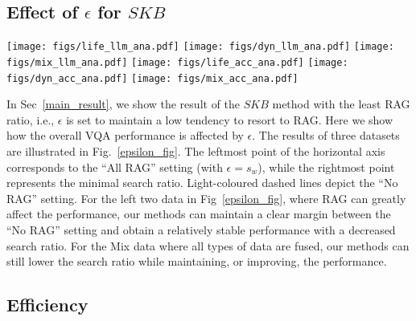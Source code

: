 \subsection{Effect of $\epsilon$ for $SKB$}
\label{epsilon_section}


\begin{figure*}[tb]
    \centering
    \texttt{[image: figs/life\_llm\_ana.pdf]}
    \texttt{[image: figs/dyn\_llm\_ana.pdf]}
    \texttt{[image: figs/mix\_llm\_ana.pdf]}
    \texttt{[image: figs/life\_acc\_ana.pdf]}
    \texttt{[image: figs/dyn\_acc\_ana.pdf]}
    \texttt{[image: figs/mix\_acc\_ana.pdf]}
    \caption{Effect of $\epsilon$. The lighter dashed lines accordingly indicate the performance under each base model's ``No RAG'' setting. Knowledge Boundary model is Qwen-VL-7B-Chat.}
    \label{epsilon_fig}
\end{figure*}


In Sec~\ref{main_result}, we show the result of the $SKB$ method with the least RAG ratio, i.e., $\epsilon$ is set to maintain a low tendency to resort to RAG. Here we show how the overall VQA performance is affected by $\epsilon$. The results of three datasets are illustrated in Fig.~\ref{epsilon_fig}. The leftmost point of the horizontal axis corresponds to the ``All RAG'' setting (with $\epsilon=s_w$), while the rightmost point represents the minimal search ratio. Light-coloured dashed lines depict the ``No RAG'' setting. 
For the left two data in Fig~\ref{epsilon_fig}, where RAG can greatly affect the performance, our methods can maintain a clear margin between the ``No RAG'' setting and obtain a relatively stable performance with a decreased search ratio. For the Mix data where all types of data are fused, our methods can still lower the search ratio while maintaining, or improving, the performance.


\subsection{Efficiency}

